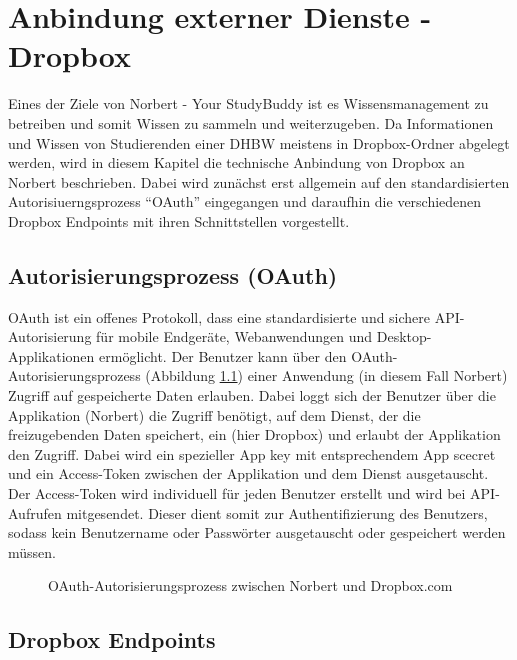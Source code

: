 

\chapter{Anbindung externer Dienste - Dropbox}

Eines der Ziele von Norbert - Your StudyBuddy ist es Wissensmanagement zu betreiben und somit Wissen zu sammeln und weiterzugeben. Da Informationen und Wissen von Studierenden einer DHBW meistens in Dropbox-Ordner abgelegt werden, wird in diesem Kapitel die technische Anbindung von Dropbox an Norbert beschrieben. Dabei wird zunächst erst allgemein auf den standardisierten Autorisiuerngsprozess \enquote{OAuth} eingegangen und daraufhin die verschiedenen Dropbox Endpoints mit ihren Schnittstellen vorgestellt.


\section{Autorisierungsprozess (OAuth)}

OAuth ist ein offenes Protokoll, dass eine standardisierte und sichere API-Autorisierung für mobile Endgeräte, Webanwendungen und Desktop-Applikationen ermöglicht. Der Benutzer kann über den OAuth-Autorisierungsprozess (Abbildung \ref{04ergebnis:oauth}) einer Anwendung (in diesem Fall Norbert) Zugriff auf gespeicherte Daten erlauben. Dabei loggt sich der Benutzer über die Applikation (Norbert) die Zugriff benötigt, auf dem Dienst, der die freizugebenden Daten speichert, ein (hier Dropbox) und erlaubt der Applikation den Zugriff. Dabei wird ein spezieller App key mit entsprechendem App scecret und ein Access-Token zwischen der Applikation und dem Dienst ausgetauscht. Der Access-Token wird individuell für jeden Benutzer erstellt und wird bei API-Aufrufen mitgesendet. Dieser dient somit zur Authentifizierung des Benutzers, sodass kein Benutzername oder Passwörter ausgetauscht oder gespeichert werden müssen.

\begin{figure}[H]
\centering
	\scalebox{0.5}{}
	\caption{OAuth-Autorisierungsprozess zwischen Norbert und Dropbox.com}
	\label{04ergebnis:oauth}	
\end{figure}


\section{Dropbox Endpoints}

